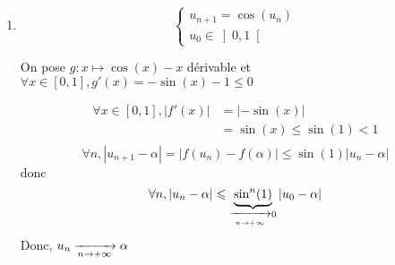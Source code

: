 \begin{exm}
	\begin{enumerate}
		\item \[
		\begin{cases}
			u_{n+1} = \cos(u_n)\\
			u_0\in \left] 0,1 \right[
		\end{cases}
		\]
		\begin{center}
		\end{center}
		On pose $g: x \mapsto \cos(x)-x$ dérivable et \\$\forall x\in  \left[ 0,1 \right], g'(x)=-\sin(x)-1 \le 0$ 
		
		\begin{center}
		\end{center}
		\begin{center}
		\end{center}
		\begin{align*}
			\forall x\in \left[ 0,1 \right], \left| f'(x) \right| &= \left| -\sin(x) \right|  \\
			&= \sin(x) \le \sin(1) < 1 \\
		\end{align*}\[
		\forall n, \left| u_{n+1}-\alpha \right| = \left| f(u_n) - f(\alpha) \right|  \le \sin(1)\left| u_n-\alpha \right| 
		\] donc \[
		\forall n, \left| u_n-\alpha \right| \leqslant \underbrace{\sin^n(1)}_{\xrightarrow[n\to +\infty]{}0} \left| u_0-\alpha \right| 
		\] Donc, $u_n\xrightarrow[n\to +\infty]{}\alpha$
	\end{enumerate}
\end{exm}
